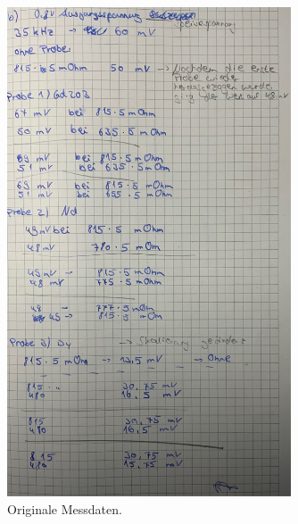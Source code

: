 \begin{figure}[H]
    \centering
    \includegraphics[width=0.75\textwidth]{data/origDaten2.jpg}
    \caption{Originale Messdaten.}
    \label{fig:daten2}
\end{figure}
